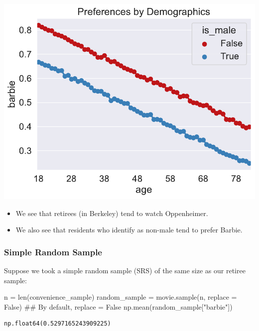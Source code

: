 \documentclass[
  letterpaper,
  DIV=11,
  numbers=noendperiod]{scrreprt}
\newenvironment{Shaded}{\begin{snugshade}}{\end{snugshade}}
\newcommand{\BuiltInTok}[1]{\textcolor[rgb]{0.00,0.23,0.31}{#1}}
\newcommand{\CommentTok}[1]{\textcolor[rgb]{0.37,0.37,0.37}{#1}}
\newcommand{\NormalTok}[1]{\textcolor[rgb]{0.00,0.23,0.31}{#1}}
\newcommand{\OperatorTok}[1]{\textcolor[rgb]{0.37,0.37,0.37}{#1}}
\newcommand{\StringTok}[1]{\textcolor[rgb]{0.13,0.47,0.30}{#1}}
\newcommand{\VariableTok}[1]{\textcolor[rgb]{0.07,0.07,0.07}{#1}}
\providecommand{\tightlist}{%
  \setlength{\itemsep}{0pt}\setlength{\parskip}{0pt}}\usepackage{longtable,booktabs,array}
\begin{document}
\includegraphics{sampling/sampling_files/figure-pdf/cell-9-output-1.pdf}

\begin{itemize}
\tightlist
\item
  We see that retirees (in Berkeley) tend to watch Oppenheimer.
\item
  We also see that residents who identify as non-male tend to prefer
  Barbie.
\end{itemize}

\subsubsection{Simple Random Sample}\label{simple-random-sample}

Suppose we took a simple random sample (SRS) of the same size as our
retiree sample:

\begin{Shaded}
\begin{Highlighting}[]
\NormalTok{n }\OperatorTok{=} \BuiltInTok{len}\NormalTok{(convenience\_sample)}
\NormalTok{random\_sample }\OperatorTok{=}\NormalTok{ movie.sample(n, replace }\OperatorTok{=} \VariableTok{False}\NormalTok{) }\CommentTok{\#\# By default, replace = False}
\NormalTok{np.mean(random\_sample[}\StringTok{"barbie"}\NormalTok{])}
\end{Highlighting}
\end{Shaded}

\begin{verbatim}
np.float64(0.5297165243909225)
\end{verbatim}
\end{document}
